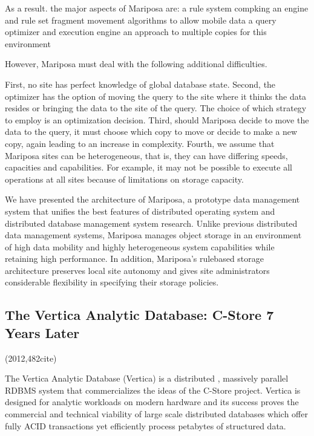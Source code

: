 \documentclass[a4paper,twoside]{scrbook}
\begin{document}
As a result. the major aspects of Mariposa are: 
a rule system compking an engine and rule set 
fragment movement algorithms to allow mobile data 
a query optimizer and execution engine 
an approach to multiple copies for this environment 

However, Mariposa must deal with the following additional difficulties.

First, no site has perfect knowledge of global database state.
Second, the optimizer has the option of moving the query to the site where it thinks the data resides or bringing the data to the site of the query. The choice of which strategy to employ is an optimization decision.
Third, should Mariposa decide to move the data to the query, it must choose which copy to move or decide to make a new copy, again leading to an increase in complexity.
Fourth, we assume that Mariposa sites can be heterogeneous, that is, they can have differing speeds, capacities and capabilities. For example, it may not be possible to execute all operations at all sites because of limitations on storage capacity.

We have presented the architecture of Mariposa, a prototype data management system that unifies the best features of distributed operating system and distributed database management system research. Unlike previous distributed data management systems, Mariposa manages object storage in an environment of high data mobility and highly heterogeneous system capabilities while retaining high performance. In addition, Mariposa’s rulebased storage architecture preserves local site autonomy and gives site administrators considerable flexibility in specifying their storage policies.

\subsection{The Vertica Analytic Database: C-Store 7 Years Later\cite{lamb2012vertica}}
(2012,482cite)\par

The Vertica Analytic Database (Vertica) is a distributed , massively parallel RDBMS system that commercializes the ideas of the C-Store project.
Vertica is designed for analytic workloads on modern hardware and its success proves the commercial and technical viability of large scale distributed databases which offer fully ACID transactions yet efficiently process petabytes of structured data.
\end{document}
